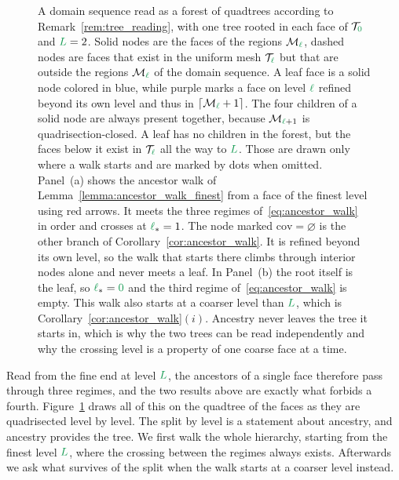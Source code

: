 \documentclass[a4paper, 12pt]{article}
\newcommand{\lstar}{\l_{\ast}}
\newcommand{\green}{\color{ForestGreen}}
\newcommand{\T}{\mathcal{T}}
\renewcommand{\l}{{\green\ell}}
\renewcommand{\L}{{\green L}}
\newcommand{\lzero}{{\green 0}}
\newcommand{\M}{\mathcal{M}}
\theoremstyle{definition}
\theoremstyle{plain}
\numberwithin{equation}{section}
\newcommand{\ancestorPatch}[1]{\lceil #1 \rceil}
\newcommand{\coveringFace}{\mathrm{cov}}                    %
\begin{document}
\begin{figure}[tb]
\begin{tikzpicture}
\end{tikzpicture}
\captionsetup{skip=4pt}
\caption{A domain sequence read as a forest of quadtrees according to Remark~\ref{rem:tree_reading}, with one tree rooted in each face of $\T_\lzero$ and $\L = 2$. Solid nodes are the faces of the regions $\M_\l$, dashed nodes are faces that exist in the uniform mesh $\T_\l$ but that are outside the regions $\M_\l$ of the domain sequence. A leaf face is a solid node colored in blue, while purple marks a face on level $\l$ refined beyond its own level and thus in $\ancestorPatch{\M_\l+1}$. The four children of a solid node are always present together, because $\M_{\l+1}$ is quadrisection-closed. A leaf has no children in the forest, but the faces below it exist in $\T_\l$ all the way to $\L$. Those are drawn only where a walk starts and are marked by dots when omitted.
Panel~(a) shows the ancestor walk of Lemma~\ref{lemma:ancestor_walk_finest} from a face of the finest level using red arrows. It meets the three regimes of~\eqref{eq:ancestor_walk} in order and crosses at $\lstar = 1$. The node marked $\coveringFace = \varnothing$ is the other branch of Corollary~\ref{cor:ancestor_walk}. It is refined beyond its own level, so the walk that starts there climbs through interior nodes alone and never meets a leaf.
In Panel~(b) the root itself is the leaf, so $\lstar = \lzero$ and the third regime of~\eqref{eq:ancestor_walk} is empty. This walk also starts at a coarser level than $\L$, which is Corollary~\ref{cor:ancestor_walk}$(i)$. Ancestry never leaves the tree it starts in, which is why the two trees can be read independently and why the crossing level is a property of one coarse face at a time.}
\label{fig:ancestor_walk}
\end{figure}

Read from the fine end at level $\L$, the ancestors of a single face therefore pass through three regimes, and the two results above are exactly what forbids a fourth. Figure~\ref{fig:ancestor_walk} draws all of this on the quadtree of the faces as they are quadrisected level by level. The split by level is a statement about ancestry, and ancestry provides the tree. We first walk the whole hierarchy, starting from the finest level $\L$, where the crossing between the regimes always exists. Afterwards we ask what survives of the split when the walk starts at a coarser level instead.
\end{document}
